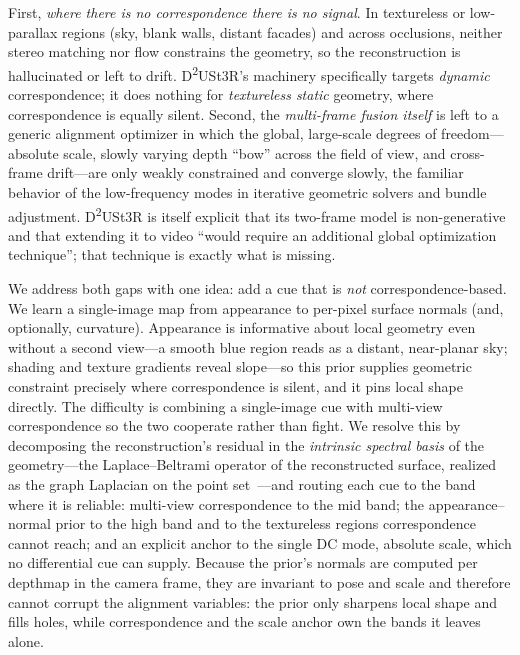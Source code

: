 \documentclass{article}
\begin{document}
First, \emph{where there is no correspondence there is no signal}. In
textureless or low-parallax regions (sky, blank walls, distant facades) and
across occlusions, neither stereo matching nor flow constrains the geometry,
so the reconstruction is hallucinated or left to drift. D\textsuperscript{2}USt3R's
machinery specifically targets \emph{dynamic} correspondence; it does nothing
for \emph{textureless static} geometry, where correspondence is equally
silent. Second, the \emph{multi-frame fusion itself} is left to a generic
alignment optimizer in which the global, large-scale degrees of
freedom---absolute scale, slowly varying depth ``bow'' across the field of
view, and cross-frame drift---are only weakly constrained and converge slowly,
the familiar behavior of the low-frequency modes in iterative geometric
solvers and bundle adjustment. D\textsuperscript{2}USt3R is itself explicit
that its two-frame model is non-generative and that extending it to video
``would require an additional global optimization technique''; that technique
is exactly what is missing.

We address both gaps with one idea: add a cue that is \emph{not}
correspondence-based. We learn a single-image map from appearance to per-pixel
surface normals (and, optionally, curvature). Appearance is informative about
local geometry even without a second view---a smooth blue region reads as a
distant, near-planar sky; shading and texture gradients reveal slope---so this
prior supplies geometric constraint precisely where correspondence is silent,
and it pins local shape directly. The difficulty is combining a single-image
cue with multi-view correspondence so the two cooperate rather than fight. We
resolve this by decomposing the reconstruction's residual in the
\emph{intrinsic spectral basis} of the geometry---the Laplace--Beltrami
operator of the reconstructed surface, realized as the graph Laplacian on the
point set~\cite{belkin2003laplacian,coifman2006diffusion,levy2006laplace}---and routing each cue to the
band where it is reliable: multi-view correspondence to the mid band; the
appearance--normal prior to the high band and to the textureless regions
correspondence cannot reach; and an explicit anchor to the single DC mode,
absolute scale, which no differential cue can supply. Because the prior's
normals are computed per depthmap in the camera frame, they are invariant to
pose and scale and therefore cannot corrupt the alignment variables: the prior
only sharpens local shape and fills holes, while correspondence and the scale
anchor own the bands it leaves alone.
\end{document}
